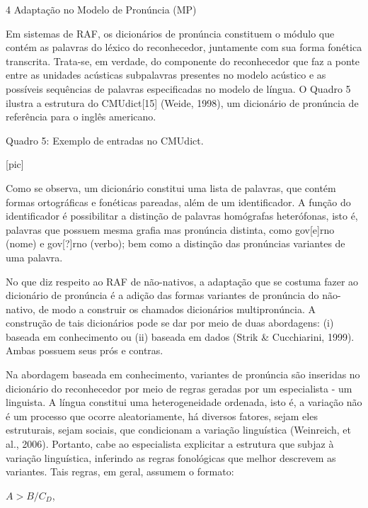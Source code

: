 4 Adapta\c{c}\~ao no Modelo de Pron\'uncia (MP)

Em sistemas de RAF, os dicion\'arios de pron\'uncia constituem o m\'odulo que
cont\'em as palavras do l\'exico do reconhecedor, juntamente com sua forma
fon\'etica transcrita. Trata-se, em verdade, do componente do reconhecedor
que faz a ponte entre as unidades ac\'usticas subpalavras presentes no
modelo ac\'ustico e as poss\'iveis sequ\^encias de palavras especificadas no
modelo de l\'ingua. O Quadro 5 ilustra a estrutura do CMUdict{[}15{]}
(Weide, 1998), um dicion\'ario de pron\'uncia de refer\^encia para o ingl\^es
americano.

              Quadro 5: Exemplo de entradas no CMUdict.

                                [pic]

Como se observa, um dicion\'ario constitui uma lista de palavras, que
cont\'em formas ortogr\'aficas e fon\'eticas pareadas, al\'em de um
identificador. A fun\c{c}\~ao do identificador \'e possibilitar a distin\c{c}\~ao de
palavras hom\'ografas heter\'ofonas, isto \'e, palavras que possuem mesma
grafia mas pron\'uncia distinta, como gov{[}e{]}rno (nome) e gov{[}?{]}rno
(verbo); bem como a distin\c{c}\~ao das pron\'uncias variantes de uma palavra.

No que diz respeito ao RAF de n\~ao-nativos, a adapta\c{c}\~ao que se costuma
fazer ao dicion\'ario de pron\'uncia \'e a adi\c{c}\~ao das formas variantes de
pron\'uncia do n\~ao-nativo, de modo a construir os chamados dicion\'arios
multipron\'uncia. A constru\c{c}\~ao de tais dicion\'arios pode se dar por meio de
duas abordagens: (i) baseada em conhecimento ou (ii) baseada em dados
(Strik \& Cucchiarini, 1999). Ambas possuem seus pr\'os e contras.

Na abordagem baseada em conhecimento, variantes de pron\'uncia s\~ao
inseridas no dicion\'ario do reconhecedor por meio de regras geradas por
um especialista - um linguista. A l\'ingua constitui uma heterogeneidade
ordenada, isto \'e, a varia\c{c}\~ao n\~ao \'e um processo que ocorre
aleatoriamente, h\'a diversos fatores, sejam eles estruturais, sejam
sociais, que condicionam a varia\c{c}\~ao lingu\'istica (Weinreich, et al.,
2006). Portanto, cabe ao especialista explicitar a estrutura que subjaz
à varia\c{c}\~ao lingu\'istica, inferindo as regras fonol\'ogicas que melhor
descrevem as variantes. Tais regras, em geral, assumem o formato:

                            $A > B / C_D$,

